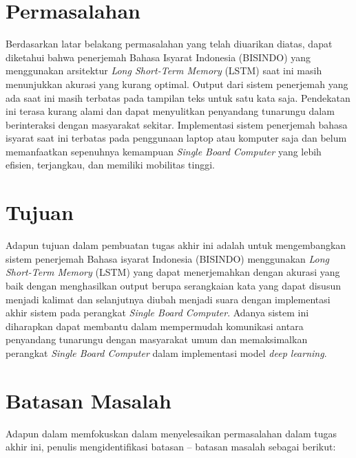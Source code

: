 \section{Permasalahan}
\label{sec:permasalahan}

Berdasarkan latar belakang permasalahan yang telah diuarikan diatas, dapat diketahui bahwa penerjemah Bahasa Isyarat Indonesia (BISINDO) yang menggunakan arsitektur \emph{Long Short-Term Memory} (LSTM) saat ini masih menunjukkan akurasi yang kurang optimal. Output dari sistem penerjemah yang ada saat ini masih terbatas pada tampilan teks untuk satu kata saja. Pendekatan ini terasa kurang alami dan dapat menyulitkan penyandang tunarungu dalam berinteraksi dengan masyarakat sekitar. Implementasi sistem penerjemah bahasa isyarat saat ini terbatas pada penggunaan laptop atau komputer saja dan belum memanfaatkan sepenuhnya kemampuan \emph{Single Board Computer} yang lebih efisien, terjangkau, dan memiliki mobilitas tinggi.

\section{Tujuan}
\label{sec:Tujuan}

Adapun tujuan dalam pembuatan tugas akhir ini adalah untuk mengembangkan sistem penerjemah Bahasa isyarat Indonesia (BISINDO) menggunakan \emph{Long Short-Term Memory} (LSTM) yang dapat menerjemahkan dengan akurasi yang baik dengan menghasilkan output berupa serangkaian kata yang dapat disusun menjadi kalimat dan selanjutnya diubah menjadi suara dengan implementasi akhir sistem pada perangkat \emph{Single Board Computer}. Adanya sistem ini diharapkan dapat membantu dalam mempermudah komunikasi antara penyandang tunarungu dengan masyarakat umum dan memaksimalkan perangkat \emph{Single Board Computer} dalam implementasi model \emph{deep learning}.  

\newpage

\section{Batasan Masalah}
\label{sec:batasanmasalah}

Adapun dalam memfokuskan dalam menyelesaikan permasalahan dalam tugas akhir ini, penulis mengidentifikasi batasan – batasan masalah sebagai berikut:

